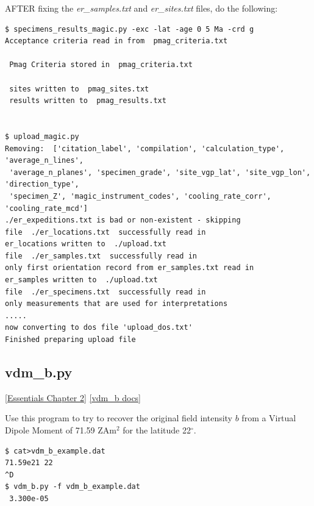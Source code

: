 \documentclass[11pt]{book}
\begin{document}
{AFTER fixing the {\it er\_samples.txt} and {\it er\_sites.txt} files, do the following:



\begin{verbatim}
$ specimens_results_magic.py -exc -lat -age 0 5 Ma -crd g
Acceptance criteria read in from  pmag_criteria.txt

 Pmag Criteria stored in  pmag_criteria.txt

 sites written to  pmag_sites.txt
 results written to  pmag_results.txt


$ upload_magic.py
Removing:  ['citation_label', 'compilation', 'calculation_type', 'average_n_lines',
 'average_n_planes', 'specimen_grade', 'site_vgp_lat', 'site_vgp_lon', 'direction_type',
 'specimen_Z', 'magic_instrument_codes', 'cooling_rate_corr', 'cooling_rate_mcd']
./er_expeditions.txt is bad or non-existent - skipping
file  ./er_locations.txt  successfully read in
er_locations written to  ./upload.txt
file  ./er_samples.txt  successfully read in
only first orientation record from er_samples.txt read in
er_samples written to  ./upload.txt
file  ./er_specimens.txt  successfully read in
only measurements that are used for interpretations
.....
now converting to dos file 'upload_dos.txt'
Finished preparing upload file
\end{verbatim}




%

\subsection{vdm\_b.py}
\href{http://earthref.org/MAGIC/books/Tauxe/Essentials/WebBook3ch2.html#ch2}{[Essentials Chapter 2]}
\href{https://github.com/PmagPy/PmagPy/blob/master/programs/vdm_b.py}{[vdm\_b docs]}


Use this program to try to recover the original field intensity $b$ from a Virtual Dipole Moment of  71.59 ZAm$^2$ for the latitude 22$^{\circ}$.

\begin{verbatim}
$ cat>vdm_b_example.dat
71.59e21 22
^D
$ vdm_b.py -f vdm_b_example.dat
 3.300e-05
\end{verbatim}

}
\end{document}

